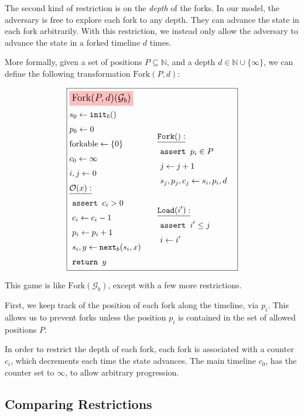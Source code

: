 The second kind of restriction is on the \emph{depth} of the forks.
In our model, the adversary is free to explore each fork to any depth.
They can advance the state in each fork arbitrarily.
With this restriction, we instead only allow the adversary to advance
the state in a forked timeline $d$ times.

More formally, given a set of positions $P \subseteq \mathbb{N}$, and
a depth
$ d \in \mathbb{N} \cup \{\infty\}$, we can define the following
transformation $\text{Fork}(P, d)$:

\begin{game}
\captionsetup{justification=centering}
$$
\boxed{
\begin{aligned}
&\colorbox{pink}{\large $\text{Fork}(P, d)(\mathcal{G}_b)$}\cr
&\begin{aligned}
    &s_0 \gets \texttt{init}_b()\cr
    &p_0 \gets 0\cr
    &\text{forkable} \gets \{0\}\cr
    &c_0 \gets \infty\cr
    &i, j \gets 0\cr
    &\underline{\mathcal{O}(x):}\cr
    &\ \texttt{assert } c_i > 0\cr
    &\ c_i \gets c_i - 1\cr
    &\ p_i \gets p_i + 1\cr
    &\ s_i, y \gets \texttt{next}_b(s_i, x)\cr
    &\ \texttt{return } y\cr
\end{aligned}
&\begin{aligned}
    &\underline{\texttt{Fork}():}\cr
    &\ \texttt{assert } p_i \in P\cr
    &\ j \gets j + 1\cr
    &\ s_j, p_j, c_j \gets s_i, p_i, d\cr
    &\cr
    &\underline{\texttt{Load}(i'):}\cr
    &\ \texttt{assert } i' \leq j\cr
    &\ i \gets i'\cr
\end{aligned}\cr
\end{aligned}
}
$$
\caption{$\text{Fork}(\mathcal{G}_b)$}
\end{game}

This game is like $\text{Fork}(\mathcal{G}_b)$, except with a few more restrictions.

First, we keep track of the position of each fork along the timeline,
via $p_i$. 
This allows us to prevent forks unless the position $p_i$ is contained
in the set of allowed positions $P$.

In order to restrict the depth of each fork, each fork is associated
with a counter $c_i$, which decrements each time the state advances.
The main timeline $c_0$, has the counter set to $\infty$, to allow
arbitrary progression.

\subsection{Comparing Restrictions}

